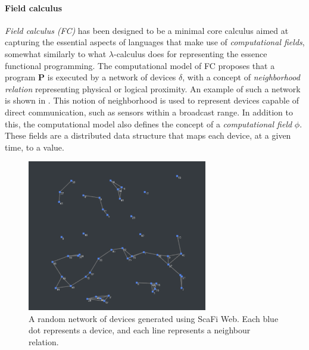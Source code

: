 \documentclass[12pt,a4paper,openright,twoside]{book}
\begin{document}
\paragraph{Field calculus}
\emph{Field calculus (FC)} \cite{fieldcalculus} has been designed to be a minimal core calculus aimed at capturing the essential 
    aspects of languages that make use of \emph{computational fields}, somewhat similarly to what $\lambda$-calculus does for 
    representing the essence functional programming. 
    The computational model of FC proposes that a program \textbf{P} is executed by a network of devices $\delta$, with a concept 
    of \emph{neighborhood relation} representing physical or logical proximity. An example of such a network is shown in . 
    This notion of neighborhood is used to represent devices capable of direct communication, such as sensors within a broadcast range. 
    In addition to this, the computational model also defines the concept of a \emph{computational field} $\phi$. These fields are 
    a distributed data structure that maps each device, at a given time, to a value.

\begin{figure}[t]
    \centering
    \includegraphics[width=0.7\textwidth]{figures/random-network-black.png}
    \caption{A random network of devices generated using ScaFi Web. 
        Each blue dot represents a device, and each line represents a neighbour relation.}
    \label{fig:random-network}
\end{figure}
\end{document}
